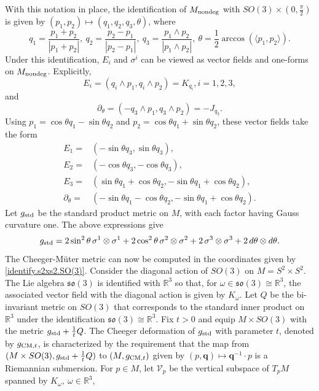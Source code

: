 \documentclass[11pt]{amsart}
\theoremstyle{definition}
\begin{document}
With this notation in place, the identification of $M_{\text{\rm nondeg}}$ with $SO(3)\times (0,\frac{\pi}{2})$ is given by $(p_1,p_2)\mapsto (q_1,q_2,q_3,\theta)$, where
\begin{equation}\label{identify.s2xs2.SO(3)}
q_1=\frac{p_1+p_2}{|p_1+p_2|},\ q_2=\frac{p_2-p_1}{|p_2-p_1|},\ q_3=\frac{p_1\wedge p_2}{|p_1\wedge p_2|},\ \theta=\frac{1}{2}\arccos(\langle p_1,p_2\rangle).
\end{equation}
Under this identification, $E_i$ and $\sigma^i$ can be viewed as vector fields and one-forms on $M_{\text{\rm nondeg}}$.
Explicitly,
\[
E_i=(q_i\wedge p_1, q_i\wedge p_2)=K_{q_i}, i=1,2,3,
\]
and
\[
\partial_\theta=(-q_3\wedge p_1,q_3\wedge p_2)=-J_{q_3}.
\]
Using $p_1=\cos\theta q_1-\sin\theta q_2$ and $p_2=\cos\theta q_1+\sin\theta q_2$, these vector fields take the form
\begin{align*}
E_1=& (-\sin\theta q_3, \sin\theta q_3),\\
E_2=&(-\cos\theta q_3, -\cos\theta q_3),\\
E_3=& (\sin\theta q_1+\cos\theta q_2, -\sin\theta q_1+\cos\theta q_2),\\
\partial_\theta=& (-\sin\theta q_1-\cos\theta q_2,-\sin\theta q_1+\cos\theta q_2).
\end{align*}
Let $g_{\text{\rm std}}$ be the standard product metric on $M$, with each factor having Gauss curvature one.
The above expressions give
\[
g_{\text{\rm std}}=2\sin^2\theta \, \sigma^1\otimes \sigma^1+2\cos^2\theta \, \sigma^2\otimes \sigma^2+2 \, \sigma^3\otimes \sigma^3+2 \, d\theta\otimes d\theta.\]
The Cheeger-M\"uter metric can now be computed in the coordinates given by \eqref{identify.s2xs2.SO(3)}.
Consider the diagonal action of $SO(3)$ on $M = S^2\times S^2$.
The Lie algebra $\mathfrak{so}(3)$ is identified with $\mathbb{R}^3$ so that, for $\omega\in \mathfrak{so}(3)\cong\mathbb{R}^3$,
the associated vector field with the diagonal action is given by $K_\omega$.
Let $Q$ be the bi-invariant metric on $SO(3)$ that corresponds to the standard inner product on $\mathbb{R}^3$ under the identification $\mathfrak{so}(3)\cong \mathbb{R}^3$.
Fix $t>0$ and equip $M \times SO(3)$ with the metric $g_{\text{\rm std}}+\frac{1}{t}Q$.
The Cheeger deformation of $g_{\text{\rm std}}$ with parameter $t$, denoted by $g_{\text{\rm CM},t}$, is characterized by the requirement that the map from $(M \times SO(3),g_{\text{\rm std}}+\frac{1}{t}Q)$ to $(M,g_{\text{\rm CM},t})$ given by $(p,\mathbf{q})\mapsto \mathbf{q}^{-1}\cdot p$ is a Riemannian submersion.
For $p\in M$, let $\mathcal{V}_p$ be the vertical subspace of $T_p M$ spanned by $K_\omega,\ \omega\in\mathbb{R}^3$,
\end{document}
